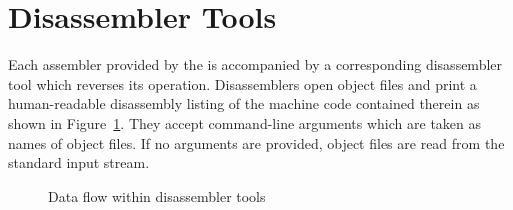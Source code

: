 \asmprint
\amdaasm
\amdbasm
\amdcasm
\armaasm
\armbasm
\armcasm
\avrasm
\avrttasm
\mabkasm
\miblasm
\mipsaasm
\mipsbasm
\mmixasm
\orokasm
\ppcaasm
\ppcbasm
\riscasm
\wasmasm

\section{Disassembler Tools}

Each assembler provided by the \ecs{} is accompanied by a corresponding disassembler tool which reverses its operation.
Disassemblers open object files and print a human-readable disassembly listing of the machine code contained therein as shown in Figure~\ref{fig:dismdataflow}.
They accept command-line arguments which are taken as names of object files.
If no arguments are provided, object files are read from the standard input stream.
\seeinterface\seeguide

\begin{figure}
\caption{Data flow within disassembler tools}
\label{fig:dismdataflow}
\end{figure}

\amdadism
\amdbdism
\amdcdism
\armadism
\armbdism
\armcdism
\avrdism
\avrttdism
\mabkdism
\mibldism
\mipsadism
\mipsbdism
\mmixdism
\orokdism
\ppcadism
\ppcbdism
\riscdism
\wasmdism

\concludechapter
